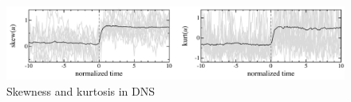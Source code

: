 \documentclass[11pt]{article}
\newcommand{\vsp}[1]{\vspace{#1 pc} \noindent}
\begin{document}
\begin{figure}%
\begin{center}
\includegraphics[width = 0.99 \linewidth]{Figs/skew-kurt.pdf}
\caption{
Skewness and kurtosis in DNS}
\label{skew-kurt}
\end{center}
\end{figure}
 
 
\vsp{5}
\end{document}
